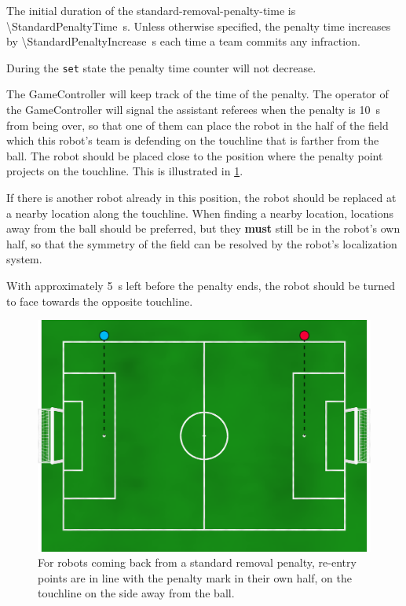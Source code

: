 The initial duration of the standard-removal-penalty-time is \qty{\StandardPenaltyTime}{\second}.
Unless otherwise specified, the penalty time increases by \qty{\StandardPenaltyIncrease}{\second} each time a team commits any infraction.

During the \texttt{set} state the penalty time counter will not decrease.

The GameController will keep track of the time of the penalty.
The operator of the GameController will signal the assistant referees when the penalty is \qty{10}{\second} from being over, so that one of them can place the robot in the half of the field which this robot's team is defending on the touchline that is farther from the ball.
The robot should be placed close to the position where the penalty point projects on the touchline.
This is illustrated in \cref{fig:penalty_re-entry_points}.

If there is another robot already in this position, the robot should be replaced at a nearby location along the touchline.
When finding a nearby location, locations away from the ball should be preferred, but they \textbf{must} still be in the robot's own half, so that the symmetry of the field can be resolved by the robot's localization system.

With approximately \qty{5}{\second} left before the penalty ends, the robot should be turned to face towards the opposite touchline.

\begin{figure}[t]
  \centerline{\includegraphics[width=\columnwidth]{figs/penalty_re-entry_points_2020.png}}
  \caption{For robots coming back from a standard removal penalty, re-entry points are in line with the penalty mark in their own half, on the touchline on the side away from the ball.}
  \label{fig:penalty_re-entry_points}
\end{figure}

